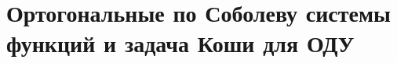 \chapter{Ортогональные по Соболеву системы функций и задача Коши для ОДУ}\label{sect-ode}



%






